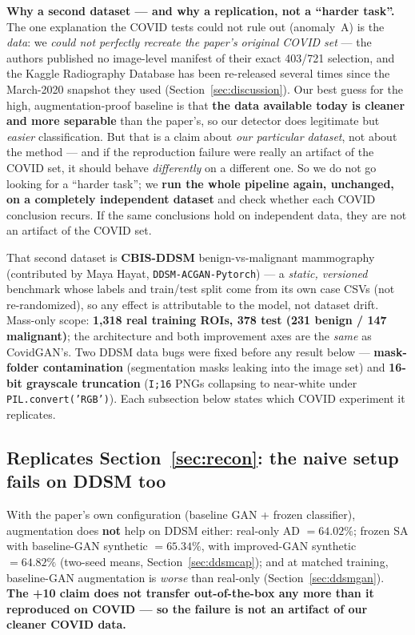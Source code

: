 \documentclass[11pt]{article}
\newcommand{\code}[1]{\texttt{#1}}
\begin{document}
\textbf{Why a second dataset --- and why a replication, not a ``harder task''.} The
one explanation the COVID tests could not rule out (anomaly~A) is the \emph{data}: we
\emph{could not perfectly recreate the paper's original COVID set} --- the authors
published no image-level manifest of their exact 403/721 selection, and the Kaggle
Radiography Database has been re-released several times since the March-2020 snapshot
they used (Section~\ref{sec:discussion}). Our best guess for the high,
augmentation-proof baseline is that \textbf{the data available today is cleaner and
more separable} than the paper's, so our detector does legitimate but \emph{easier}
classification. But that is a claim about \emph{our particular dataset}, not about the
method --- and if the reproduction failure were really an artifact of the COVID set,
it should behave \emph{differently} on a different one. So we do not go looking for a
``harder task''; we \textbf{run the whole pipeline again, unchanged, on a completely
independent dataset} and check whether each COVID conclusion recurs. If the same
conclusions hold on independent data, they are not an artifact of the COVID set.

That second dataset is \textbf{CBIS-DDSM} benign-vs-malignant mammography (contributed
by Maya Hayat, \code{DDSM-ACGAN-Pytorch}) --- a \emph{static, versioned} benchmark
whose labels and train/test split come from its own case CSVs (not re-randomized), so
any effect is attributable to the model, not dataset drift. Mass-only scope:
\textbf{1{,}318 real training ROIs, 378 test (231 benign / 147 malignant)}; the
architecture and both improvement axes are the \emph{same} as CovidGAN's. Two DDSM
data bugs were fixed before any result below --- \textbf{mask-folder contamination}
(segmentation masks leaking into the image set) and \textbf{16-bit grayscale
truncation} (\code{I;16} PNGs collapsing to near-white under
\code{PIL.convert('RGB')}). Each subsection below states which COVID experiment it
replicates.

\subsection{Replicates Section~\ref{sec:recon}: the naive setup fails on DDSM too}
With the paper's own configuration (baseline GAN + frozen classifier), augmentation
does \textbf{not} help on DDSM either: real-only AD $=64.02\%$; frozen SA with
baseline-GAN synthetic $=65.34\%$, with improved-GAN synthetic $=64.82\%$ (two-seed
means, Section~\ref{sec:ddsmcap}); and at matched training, baseline-GAN augmentation
is \emph{worse} than real-only (Section~\ref{sec:ddsmgan}). \textbf{The +10 claim does
not transfer out-of-the-box any more than it reproduced on COVID --- so the failure is
not an artifact of our cleaner COVID data.}
\end{document}
